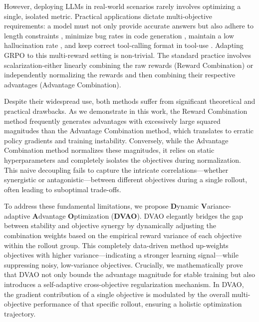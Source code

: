 \documentclass{llmxive}
\begin{document}
However, deploying LLMs in real-world scenarios rarely involves optimizing a single, isolated metric. Practical applications dictate multi-objective requirements: a model must not only provide accurate answers but also adhere to length constraints \citep{efficient_survey1, efficient_survey2}, minimize bug rates in code generation \citep{DBLP:journals/ese/TambonDNKDA25, gao2025survey}, maintain a low hallucination rate \citep{hallucination_survey1, hallucination_survey2}, and keep correct tool-calling format in tool-use \citep{search_r1, airrag}. Adapting GRPO to this multi-reward setting is non-trivial. The standard practice involves scalarization-either linearly combining the raw rewards (Reward Combination) or independently normalizing the rewards and then combining their respective advantages (Advantage Combination).

Despite their widespread use, both methods suffer from significant theoretical and practical drawbacks. As we demonstrate in this work, the Reward Combination method frequently generates advantages with excessively large squared magnitudes than the Advantage Combination method, which translates to erratic policy gradients and training instability. Conversely, while the Advantage Combination method normalizes these magnitudes, it relies on static hyperparameters and completely isolates the objectives during normalization. This naive decoupling fails to capture the intricate correlations—whether synergistic or antagonistic—between different objectives during a single rollout, often leading to suboptimal trade-offs.

To address these fundamental limitations, we propose \textbf{D}ynamic \textbf{V}ariance-adaptive \textbf{A}dvantage \textbf{O}ptimization (\textbf{DVAO}). DVAO elegantly bridges the gap between stability and objective synergy by dynamically adjusting the combination weights based on the empirical reward variance of each objective within the rollout group. This completely data-driven method up-weights objectives with higher variance—indicating a stronger learning signal—while suppressing noisy, low-variance objectives. Crucially, we mathematically prove that DVAO not only bounds the advantage magnitude for stable training but also introduces a self-adaptive cross-objective regularization mechanism. In DVAO, the gradient contribution of a single objective is modulated by the overall multi-objective performance of that specific rollout, ensuring a holistic optimization trajectory.
\end{document}
